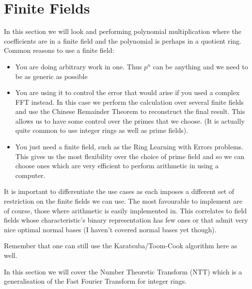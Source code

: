 \chapter{Finite Fields}\label{finite-fields}

In this section we will look and performing polynomial multiplication where the coefficients are in a finite field and the polynomial is perhaps in a quotient ring.\\

Common reasons to use a finite field:
\begin{itemize}
\item You are doing arbitrary work in one. Thus $p^n$ can be anything and we need to be as generic as possible
\item You are using it to control the error that would arise if you used a complex FFT instead. In this case we perform the calculation over several finite fields and use the Chinese Remainder Theorem to reconstruct the final result. This allows us to have some control over the primes that we choose. (It is actually quite common to use integer rings as well as prime fields).
\item You just need a finite field, such as the Ring Learning with Errors problems. This gives us the most flexibility over the choice of prime field and so we can choose ones which are very efficient to perform arithmetic in using a computer.
\end{itemize}

It is important to differentiate the use cases as each imposes a different set of restriction on the finite fields we can use. The most favourable to implement are of course, those where arithmetic is easily implemented in. This correlates to field fields whose characteristic's binary representation has few ones or that admit very nice optimal normal bases (I haven't covered normal bases yet though).

Remember that one can still use the Karatsuba/Toom-Cook algorithm here as well.

In this section we will cover the Number Theoretic Transform (NTT) which is a generalisation of the Fast Fourier Transform for integer rings. 


